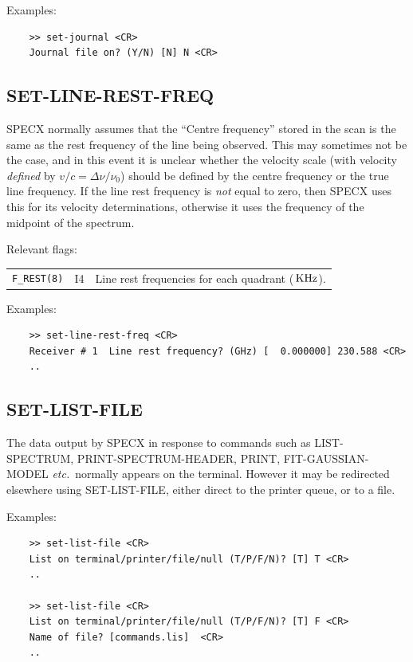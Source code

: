 \documentclass[11pt,twoside]{report}
\newcommand{\etc}{{\it etc.\,}}
\newcommand{\khz}{{\rm\,KHz}}
\begin{document}
Examples:
\begin{verbatim}
    >> set-journal <CR>
    Journal file on? (Y/N) [N] N <CR>
\end{verbatim}

\subsection{SET-LINE-REST-FREQ} 

SPECX normally assumes that the ``Centre frequency'' stored in the scan
is the same as the rest frequency of the line being observed. This may 
sometimes not be the case, and in this event it is unclear whether the 
velocity scale (with velocity {\em defined} by $v/c = \Delta\nu/\nu_0$)
should be defined by the centre frequency or the true line frequency.
If the line rest frequency is {\em not} equal to zero, then SPECX uses
this for its velocity determinations, otherwise it uses the frequency
of the midpoint of the spectrum.

Relevant flags:\\
\begin{tabular}{lll}
  \verb+F_REST(8)+ & I4 & Line rest frequencies for each quadrant ($\khz$).
\end{tabular}

Examples:
\begin{verbatim}
    >> set-line-rest-freq <CR>
    Receiver # 1  Line rest frequency? (GHz) [  0.000000] 230.588 <CR>
    ..
\end{verbatim}

\subsection{SET-LIST-FILE} 

The data output by SPECX in response to commands such as LIST-SPECTRUM,
PRINT-SPECTRUM-HEADER, PRINT, FIT-GAUSSIAN-MODEL \etc
normally appears on the terminal. However it may be
redirected elsewhere using SET-LIST-FILE, either direct to the printer queue,
or to a file. 

Examples:
\begin{verbatim}
    >> set-list-file <CR>
    List on terminal/printer/file/null (T/P/F/N)? [T] T <CR>
    ..

    >> set-list-file <CR>
    List on terminal/printer/file/null (T/P/F/N)? [T] F <CR>
    Name of file? [commands.lis]  <CR>
    ..
\end{verbatim}
\end{document}

